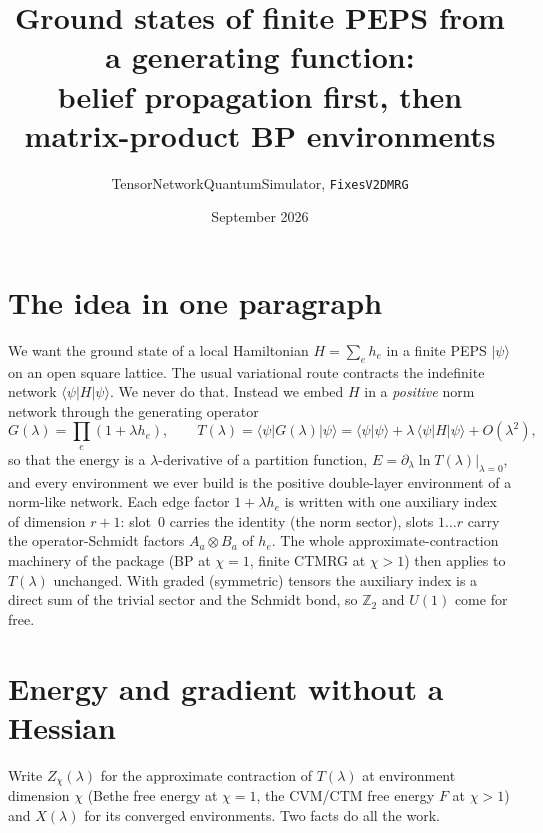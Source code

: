 \documentclass[11pt]{article}
\title{Ground states of finite PEPS from a generating function:\\
belief propagation first, then matrix-product BP environments}
\author{TensorNetworkQuantumSimulator, \texttt{FixesV2DMRG}}
\date{September 2026}
\begin{document}
\maketitle

\section*{The idea in one paragraph}

We want the ground state of a local Hamiltonian $H=\sum_e h_e$ in a finite PEPS $|\psi\rangle$
on an open square lattice. The usual variational route contracts the indefinite network
$\langle\psi|H|\psi\rangle$. We never do that. Instead we embed $H$ in a \emph{positive} norm
network through the generating operator
\begin{equation}
  G(\lambda)=\prod_e (1+\lambda h_e),\qquad
  T(\lambda)=\langle\psi|G(\lambda)|\psi\rangle = \langle\psi|\psi\rangle
  +\lambda\,\langle\psi|H|\psi\rangle+O(\lambda^2),
\end{equation}
so that the energy is a $\lambda$-derivative of a partition function,
$E=\partial_\lambda \ln T(\lambda)|_{\lambda=0}$, and every environment we ever build is the
positive double-layer environment of a norm-like network. Each edge factor $1+\lambda h_e$ is
written with one auxiliary index of dimension $r+1$: slot~0 carries the identity (the norm
sector), slots $1\ldots r$ carry the operator-Schmidt factors $A_a\otimes B_a$ of $h_e$. The whole
approximate-contraction machinery of the package (BP at $\chi=1$, finite CTMRG at $\chi>1$)
then applies to $T(\lambda)$ unchanged. With graded (symmetric) tensors the auxiliary index is a
direct sum of the trivial sector and the Schmidt bond, so $\mathbb{Z}_2$ and $U(1)$ come for free.

\section*{Energy and gradient without a Hessian}

Write $Z_\chi(\lambda)$ for the approximate contraction of $T(\lambda)$ at environment
dimension $\chi$ (Bethe free energy at $\chi=1$, the CVM/CTM free energy $F$ at $\chi>1$) and
$X(\lambda)$ for its converged environments. Two facts do all the work.
\end{document}

